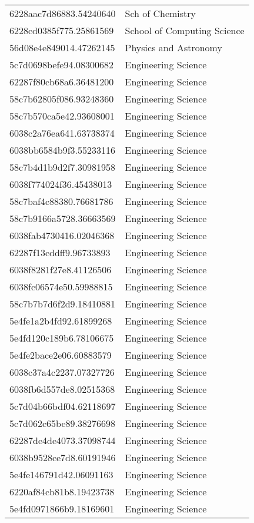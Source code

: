 \begin{tabular}{ll}
6228aac7d86883.54240640 & Sch of Chemistry \\
6228cd0385f775.25861569 & School of Computing Science \\
56d08e4e849014.47262145 & Physics and Astronomy \\
5c7d0698befe94.08300682 & Engineering Science \\
62287f80cb68a6.36481200 & Engineering Science \\
58c7b62805f086.93248360 & Engineering Science \\
58c7b570ca5e42.93608001 & Engineering Science \\
6038c2a76ea641.63738374 & Engineering Science \\
6038bb6584b9f3.55233116 & Engineering Science \\
58c7b4d1b9d2f7.30981958 & Engineering Science \\
6038f774024f36.45438013 & Engineering Science \\
58c7baf4c88380.76681786 & Engineering Science \\
58c7b9166a5728.36663569 & Engineering Science \\
6038fab4730416.02046368 & Engineering Science \\
62287f13cddff9.96733893 & Engineering Science \\
6038f8281f27e8.41126506 & Engineering Science \\
6038fc06574e50.59988815 & Engineering Science \\
58c7b7b7d6f2d9.18410881 & Engineering Science \\
5e4fe1a2b4fd92.61899268 & Engineering Science \\
5e4fd120c189b6.78106675 & Engineering Science \\
5e4fe2bace2e06.60883579 & Engineering Science \\
6038c37a4c2237.07327726 & Engineering Science \\
6038fb6d557de8.02515368 & Engineering Science \\
5c7d04b66bdf04.62118697 & Engineering Science \\
5c7d062c65be89.38276698 & Engineering Science \\
62287de4de4073.37098744 & Engineering Science \\
6038b9528ce7d8.60191946 & Engineering Science \\
5e4fe146791d42.06091163 & Engineering Science \\
6220af84cb81b8.19423738 & Engineering Science \\
5e4fd0971866b9.18169601 & Engineering Science \\

\end{tabular}
